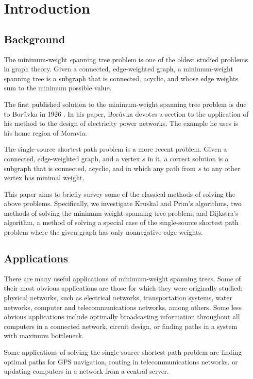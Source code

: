 \documentclass[11pt]{article}
\begin{document}
\section{Introduction}

\subsection{Background}

The minimum-weight spanning tree problem is one of the oldest studied problems in graph theory.
Given a connected, edge-weighted graph, a minimum-weight spanning tree is a subgraph that is connected, acyclic, and whose edge weights sum to the minimum possible value.

The first published solution to the minimum-weight spanning tree problem is due to Bor\r{u}vka in 1926 \cite{Boruvka}.
In his paper, Bor\r{u}vka devotes a section to the application of his method to the design of electricity power networks.
The example he uses is his home region of Moravia.

The single-source shortest path problem is a more recent problem.
Given a connected, edge-weighted graph, and a vertex $s$ in it, a correct solution is a subgraph that is connected, acyclic, and in which any path from $s$ to any other vertex has minimal weight.

This paper aims to briefly survey some of the classical methods of solving the above problems.
Specifically, we investigate Kruskal and Prim's algorithms, two methods of solving the minimum-weight spanning tree problem, and Dijkstra's algorithm, a method of solving a special case of the single-source shortest path problem where the given graph has only nonnegative edge weights.


\subsection{Applications}

There are many useful applications of minimum-weight spanning trees.
Some of their most obvious applications are those for which they were originally studied: physical networks, such as electrical networks, transportation systems, water networks, computer and telecommunications networks, among others.
Some less obvious applications include optimally broadcasting information throughout all computers in a connected network, circuit design, or finding paths in a system with maximum bottleneck.

Some applications of solving the single-source shortest path problem are finding optimal paths for GPS navigation, routing in telecommunications networks, or updating computers in a network from a central server.
\end{document}
